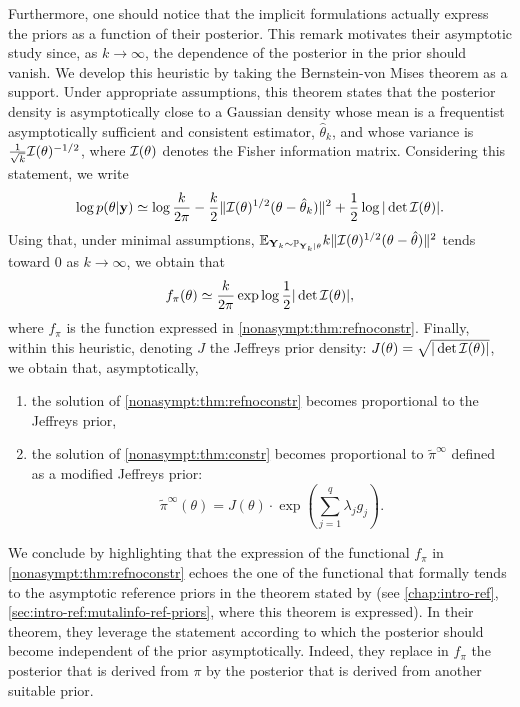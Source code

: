 Furthermore, one should notice that the implicit formulations actually express the priors as a function of their posterior. This remark motivates their asymptotic study since, as $k\rightarrow\infty$, the dependence of the posterior in the prior should vanish.
We develop this heuristic by taking the Bernstein-von Mises theorem as a support. Under appropriate assumptions, this theorem states that the posterior density is asymptotically close to a Gaussian density whose mean is a frequentist asymptotically sufficient and consistent estimator, $\hat\theta_k$, and whose variance is $\frac{1}{\sqrt{k}}\mathcal{I}(\theta)^{-1/2}$, where $\mathcal{I}(\theta)$ denotes the Fisher information matrix.
Considering this statement, we write
    \begin{equation}
        \log p(\theta|\mathbf{y}) \simeq \log \frac{k}{2\pi} - \frac{k}{2}\|\mathcal{I}(\theta)^{1/2}(\theta-\hat\theta_k)\|^2 +\frac{1}{2}\log|\det\mathcal{I}(\theta)|.
    \end{equation}
Using that, under minimal assumptions, $\mathbb{E}_{\mathbf{Y}_k\sim\mathbb{P}_{\mathbf{Y}_k|\theta}}k\|\mathcal{I}(\theta)^{1/2}(\theta-\hat\theta) \|^2$ tends toward $0$ as $k\rightarrow\infty$, we obtain that
    \begin{equation}
        f_\pi(\theta)\simeq \frac{k}{2\pi}\exp\log\frac{1}{2}|\det\mathcal{I}(\theta)|,
    \end{equation}
where $f_\pi$ is the function expressed in \cref{nonasympt:thm:refnoconstr}. 
Finally, within this heuristic, denoting $J$ the Jeffreys prior density: $J(\theta)=\sqrt{|\det\mathcal{I}(\theta)|}$, we obtain that, asymptotically, 
\begin{enumerate}
    \item the solution of \cref{nonasympt:thm:refnoconstr} becomes proportional to the Jeffreys prior,
    \item the solution of \cref{nonasympt:thm:constr} becomes proportional to $\tilde\pi^\infty$ defined as a modified Jeffreys prior:
        \begin{equation}
            \tilde\pi^\infty(\theta) = J(\theta)\cdot\exp\left(\sum_{j=1}^{q}\lambda_jg_j\right).
        \end{equation}
\end{enumerate}


We conclude by highlighting that the expression of the functional $f_\pi$ in \cref{nonasympt:thm:refnoconstr} echoes the one of the functional that formally tends to the asymptotic reference priors in the theorem stated by \citet{berger_formal_2009} (see \cref{chap:intro-ref}, \cref{sec:intro-ref:mutalinfo-ref-priors}, where this theorem is expressed).
In their theorem, they leverage the statement according to which the posterior should become independent of the prior asymptotically. Indeed, they replace in $f_\pi$ the posterior that is derived from $\pi$ by the posterior that is derived from another suitable prior. %
















